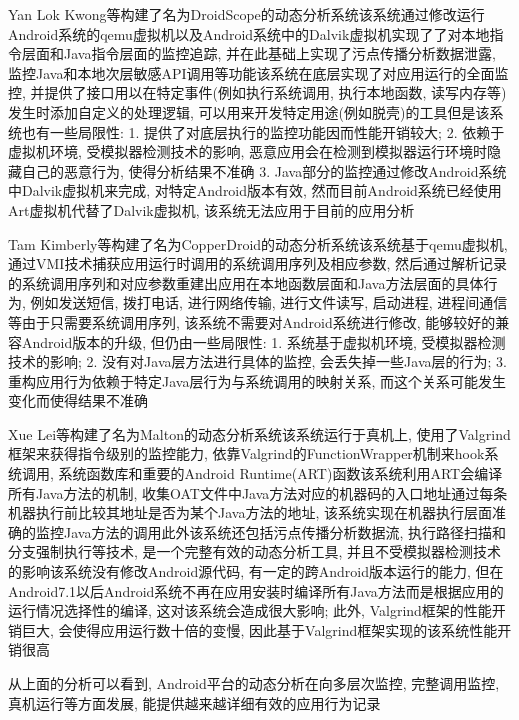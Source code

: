 Yan Lok Kwong等构建了名为DroidScope的动态分析系统\juhao 该系统通过修改运行Android系统的qemu虚拟机以及Android系统中的Dalvik虚拟机实现了了对本地指令层面和Java指令层面的监控追踪, 并在此基础上实现了污点传播分析数据泄露, 监控Java和本地次层敏感API调用等功能\juhao 该系统在底层实现了对应用运行的全面监控, 并提供了接口用以在特定事件(例如执行系统调用, 执行本地函数, 读写内存等)发生时添加自定义的处理逻辑, 可以用来开发特定用途(例如脱壳)的工具\juhao 但是该系统也有一些局限性: 
1. 提供了对底层执行的监控功能因而性能开销较大; 
2. 依赖于虚拟机环境, 受模拟器检测技术的影响, 恶意应用会在检测到模拟器运行环境时隐藏自己的恶意行为, 使得分析结果不准确
3. Java部分的监控通过修改Android系统中Dalvik虚拟机来完成, 对特定Android版本有效, 然而目前Android系统已经使用Art虚拟机代替了Dalvik虚拟机, 该系统无法应用于目前的应用分析\juhao

Tam Kimberly等构建了名为CopperDroid的动态分析系统\juhao 该系统基于qemu虚拟机, 通过VMI技术捕获应用运行时调用的系统调用序列及相应参数, 然后通过解析记录的系统调用序列和对应参数重建出应用在本地函数层面和Java方法层面的具体行为, 例如发送短信, 拨打电话, 进行网络传输, 进行文件读写, 启动进程, 进程间通信等\juhao 由于只需要系统调用序列, 该系统不需要对Android系统进行修改, 能够较好的兼容Android版本的升级, 但仍由一些局限性:
1. 系统基于虚拟机环境, 受模拟器检测技术的影响;
2. 没有对Java层方法进行具体的监控, 会丢失掉一些Java层的行为;
3. 重构应用行为依赖于特定Java层行为与系统调用的映射关系, 而这个关系可能发生变化而使得结果不准确\juhao

Xue Lei等构建了名为Malton的动态分析系统\juhao 该系统运行于真机上, 使用了Valgrind框架来获得指令级别的监控能力, 依靠Valgrind的FunctionWrapper机制来hook系统调用, 系统函数库和重要的Android Runtime(ART)函数\juhao 该系统利用ART会编译所有Java方法的机制, 收集OAT文件中Java方法对应的机器码的入口地址\juhao 通过每条机器执行前比较其地址是否为某个Java方法的地址, 该系统实现在机器执行层面准确的监控Java方法的调用\juhao 此外该系统还包括污点传播分析数据流, 执行路径扫描和分支强制执行等技术, 是一个完整有效的动态分析工具, 并且不受模拟器检测技术的影响\juhao 该系统没有修改Android源代码, 有一定的跨Android版本运行的能力, 但在Android7.1以后Android系统不再在应用安装时编译所有Java方法而是根据应用的运行情况选择性的编译, 这对该系统会造成很大影响; 此外, Valgrind框架的性能开销巨大, 会使得应用运行数十倍的变慢, 因此基于Valgrind框架实现的该系统性能开销很高\juhao



从上面的分析可以看到, Android平台的动态分析在向多层次监控, 完整调用监控, 真机运行等方面发展, 能提供越来越详细有效的应用行为记录\juhao 



